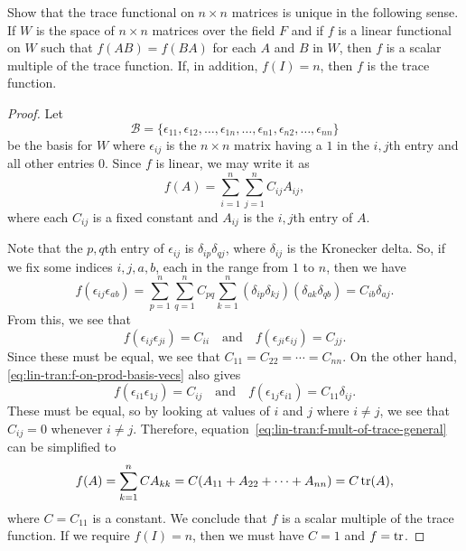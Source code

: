  Show that the trace functional on $n\times n$ matrices
is unique in the following sense. If $W$ is the space of $n\times n$
matrices over the field $F$ and if $f$ is a linear functional on $W$
such that $f(AB) = f(BA)$ for each $A$ and $B$ in $W$, then $f$ is a
scalar multiple of the trace function. If, in addition, $f(I) = n$,
then $f$ is the trace function.
\begin{proof}
  Let
  \begin{equation*}
    \mathcal{B} = \{\epsilon_{11}, \epsilon_{12}, \dots, \epsilon_{1n},
    \dots, \epsilon_{n1}, \epsilon_{n2}, \dots, \epsilon_{nn}\}
  \end{equation*}
  be the basis for $W$ where $\epsilon_{ij}$ is the $n\times n$ matrix
  having a $1$ in the $i,j$th entry and all other entries $0$. Since
  $f$ is linear, we may write it as
  \begin{equation}
    \label{eq:lin-tran:f-mult-of-trace-general}
    f(A) = \sum_{i=1}^n\sum_{j=1}^nC_{ij}A_{ij},
  \end{equation}
  where each $C_{ij}$ is a fixed constant and $A_{ij}$ is the $i,j$th
  entry of $A$.

  Note that the $p,q$th entry of $\epsilon_{ij}$ is
  $\delta_{ip}\delta_{qj}$, where $\delta_{ij}$ is the Kronecker
  delta. So, if we fix some indices $i,j,a,b$, each in the range from
  $1$ to $n$, then we have
  \begin{equation}
    \label{eq:lin-tran:f-on-prod-basis-vecs}
    f(\epsilon_{ij}\epsilon_{ab})
    = \sum_{p=1}^n\sum_{q=1}^nC_{pq}\sum_{k=1}^n(\delta_{ip}\delta_{kj})
      (\delta_{ak}\delta_{qb})
    = C_{ib}\delta_{aj}.
  \end{equation}
  From this, we see that
  \begin{equation*}
    f(\epsilon_{ij}\epsilon_{ji}) = C_{ii} \quad\text{and}\quad
    f(\epsilon_{ji}\epsilon_{ij}) = C_{jj}.
  \end{equation*}
  Since these must be equal, we see that
  $C_{11} = C_{22} = \cdots = C_{nn}$. On the other hand,
  \eqref{eq:lin-tran:f-on-prod-basis-vecs} also gives
  \begin{equation*}
    f(\epsilon_{i1}\epsilon_{1j}) = C_{ij} \quad\text{and}\quad
    f(\epsilon_{1j}\epsilon_{i1}) = C_{11}\delta_{ij}.
  \end{equation*}
  These must be equal, so by looking at values of $i$ and $j$ where
  $i\neq j$, we see that $C_{ij} = 0$ whenever $i\neq j$. Therefore,
  equation~\eqref{eq:lin-tran:f-mult-of-trace-general} can be
  simplified to
  \begin{equation*}
    f(A) = \sum_{k=1}^nCA_{kk}
    = C(A_{11} + A_{22} + \cdots + A_{nn}) = C\operatorname{tr}(A),
  \end{equation*}
  where $C = C_{11}$ is a constant. We conclude that $f$ is a scalar
  multiple of the trace function. If we require $f(I) = n$, then we
  must have $C = 1$ and $f = \operatorname{tr}$.
\end{proof}

